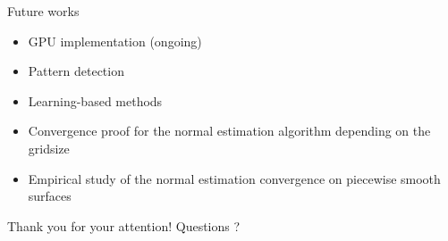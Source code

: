 \documentclass[11pt]{beamer}
\begin{document}
    \begin{frame}{Future works}
        \begin{itemize}
            \item GPU implementation (ongoing)
            \item Pattern detection
            \item Learning-based methods
            \item Convergence proof for the normal estimation algorithm depending on the gridsize
            \item Empirical study of the normal estimation convergence on piecewise smooth surfaces
        \end{itemize}
    \end{frame}

    \begin{frame}{Thank you for your attention!}
        \centering
        \Huge{Questions ?}
    \end{frame}
\end{document}
